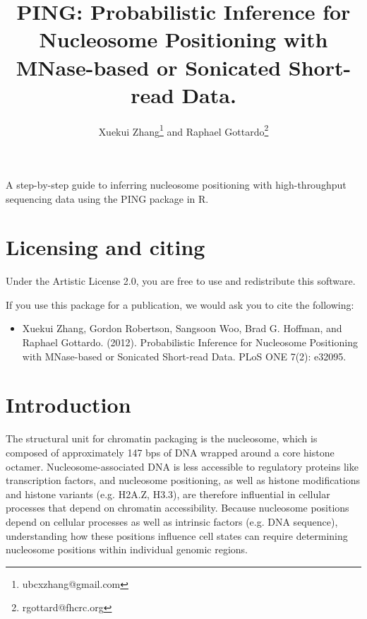 \documentclass[11pt]{article}
\author{Xuekui Zhang\footnote{ubcxzhang@gmail.com} and Raphael
  Gottardo\footnote{rgottard@fhcrc.org}}
\begin{document}
\title{PING: Probabilistic Inference for Nucleosome Positioning with MNase-based or Sonicated Short-read Data.}
\maketitle



\textnormal {\normalfont}
A step-by-step guide to inferring nucleosome positioning with high-throughput sequencing data using the PING package in R.

\tableofcontents
\newpage


\section{Licensing and citing}

Under the Artistic License 2.0, you are free to use and redistribute this software. 

If you use this package for a publication, we would ask you to cite the following: 

\begin{itemize}
\item Xuekui Zhang, Gordon Robertson, Sangsoon Woo, Brad G. Hoffman, and Raphael Gottardo. (2012). Probabilistic Inference for Nucleosome Positioning with MNase-based or Sonicated Short-read Data. PLoS ONE 7(2): e32095.
\end{itemize}


\section{Introduction}
The structural unit for chromatin packaging is the nucleosome, which is composed of approximately 147 bps of DNA wrapped around a core histone octamer.  Nucleosome-associated DNA is less accessible to regulatory proteins like transcription factors, and nucleosome positioning, as well as histone modifications and histone variants (e.g. H2A.Z, H3.3), are therefore influential in cellular processes that depend on chromatin accessibility. 
Because nucleosome positions depend on cellular processes as well as intrinsic factors (e.g. DNA sequence), understanding how these positions influence cell states can require determining nucleosome positions within individual genomic regions.%
\end{document}
